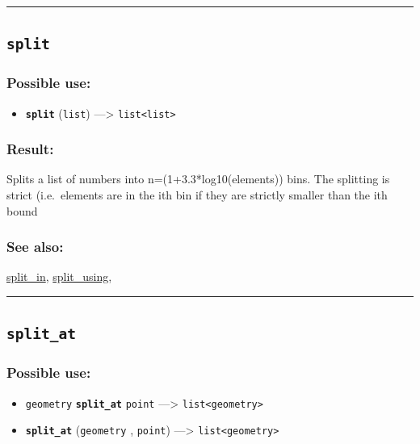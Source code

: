 \documentclass[]{book}
\providecommand{\tightlist}{%
  \setlength{\itemsep}{0pt}\setlength{\parskip}{0pt}}
\theoremstyle{definition}
\theoremstyle{definition}
\theoremstyle{definition}
\theoremstyle{remark}
\begin{document}
\begin{center}\rule{0.5\linewidth}{\linethickness}\end{center}

\subsection{\texorpdfstring{\texttt{split}}{split}}\label{split}

\subsubsection{Possible use:}\label{possible-use-491}

\begin{itemize}
\tightlist
\item
  \textbf{\texttt{split}} (\texttt{list}) ---\textgreater{}
  \texttt{list\textless{}list\textgreater{}}
\end{itemize}

\subsubsection{Result:}\label{result-475}

Splits a list of numbers into n=(1+3.3*log10(elements)) bins. The
splitting is strict (i.e.~elements are in the ith bin if they are
strictly smaller than the ith bound

\subsubsection{See also:}\label{see-also-192}

\href{operators-s-to-z.html\#split_in}{split\_in},
\href{operators-s-to-z.html\#split_using}{split\_using},

\begin{center}\rule{0.5\linewidth}{\linethickness}\end{center}

\subsection{\texorpdfstring{\texttt{split\_at}}{split\_at}}\label{split_at}

\subsubsection{Possible use:}\label{possible-use-492}

\begin{itemize}
\tightlist
\item
  \texttt{geometry} \textbf{\texttt{split\_at}} \texttt{point}
  ---\textgreater{} \texttt{list\textless{}geometry\textgreater{}}
\item
  \textbf{\texttt{split\_at}} (\texttt{geometry} , \texttt{point})
  ---\textgreater{} \texttt{list\textless{}geometry\textgreater{}}
\end{itemize}
\end{document}
